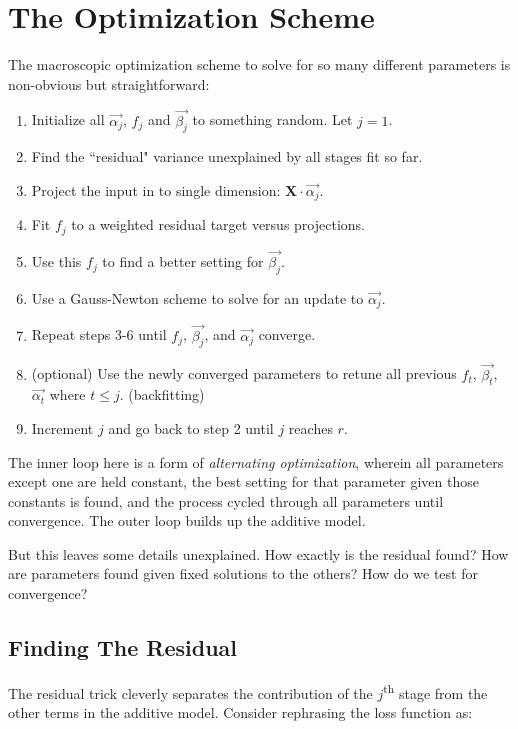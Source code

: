 \documentclass[12pt]{article}
\begin{document}
\section{The Optimization Scheme}

The macroscopic optimization scheme to solve for so many different parameters is non-obvious but straightforward:
\begin{enumerate}
	\setlength\itemsep{-2mm}
	\item Initialize all $\vec{\alpha_j}$, $f_j$ and $\vec{\beta_j}$ to something random. Let $j=1$. 
	\item Find the ``residual" variance unexplained by all stages fit so far.
	\item Project the input in to single dimension: $\pmb{X} \cdot \vec{\alpha_j}$.
	\item Fit $f_j$ to a weighted residual target versus projections.
	\item Use this $f_j$ to find a better setting for $\vec{\beta_j}$.
	\item Use a Gauss-Newton scheme to solve for an update to $\vec{\alpha_j}$.
	\item Repeat steps 3-6 until $f_j$, $\vec{\beta_j}$, and $\vec{\alpha_j}$ converge.
	\item (optional) Use the newly converged parameters to retune all previous $f_t$, $\vec{\beta_t}$, $\vec{\alpha_t}$ where $t \leq j$. (backfitting)
	\item Increment $j$ and go back to step 2 until $j$ reaches $r$.
\end{enumerate}

The inner loop here is a form of \textit{alternating optimization}, wherein all parameters except one are held constant, the best setting for that parameter given those constants is found, and the process cycled through all parameters until convergence. The outer loop builds up the additive model.

But this leaves some details unexplained. How exactly is the residual found? How are parameters found given fixed solutions to the others? How do we test for convergence?

\subsection{Finding The Residual}

The residual trick cleverly separates the contribution of the $j$\textsuperscript{th} stage from the other terms in the additive model. Consider rephrasing the loss function as:
\end{document}

